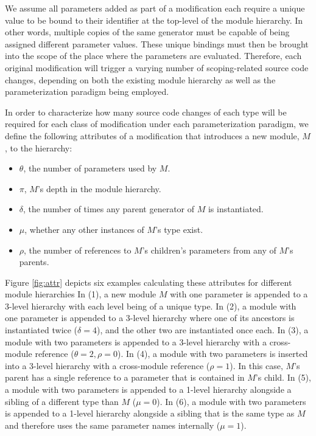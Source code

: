 We assume all parameters added as part of a modification each require a unique value to be bound to their identifier at the top-level of the module hierarchy.
In other words, multiple copies of the same generator must be capable of being assigned different parameter values.
These unique bindings must then be brought into the scope of the place where the parameters are evaluated.
Therefore, each original modification will trigger a varying number of scoping-related source code changes,
depending on both the existing module hierarchy as well as the parameterization paradigm being employed.

In order to characterize how many source code changes of each type will be required for each class of modification under each parameterization paradigm,
we define the following attributes of a modification that introduces a new module, $M$, to the hierarchy:
\begin{itemize}%
\item $\theta$, the number of parameters used by $M$.
\item $\pi$, $M$'s depth in the module hierarchy.
\item $\delta$, the number of times any parent generator of $M$ is instantiated.
\item $\mu$, whether any other instances of $M$'s type exist.
\item $\rho$, the number of references to $M$'s children's parameters from any of $M$'s parents.
\end{itemize}

Figure \ref{fig:attr} depicts six examples calculating these attributes for different module hierarchies
In (1), a new module $M$ with one parameter is appended to a 3-level hierarchy with each level being of a unique type.
In (2), a module with one parameter is appended to a 3-level hierarchy where one of its ancestors is instantiated twice ($\delta = 4$), and the other two are instantiated once each.
In (3), a module with two parameters is appended to a 3-level hierarchy with a cross-module reference ($\theta = 2, \rho = 0$).
In (4), a module with two parameters is inserted into a 3-level hierarchy with a cross-module reference ($\rho = 1$).
In this case, $M$'s parent has a single reference to a parameter that is contained in $M$'s child.
In (5), a module with two parameters is appended to a 1-level hierarchy alongside a sibling of a different type than $M$ ($\mu = 0$).
In (6), a module with two parameters is appended to a 1-level hierarchy alongside a sibling that is the same type as $M$ and therefore uses the same parameter names internally ($\mu = 1$).

